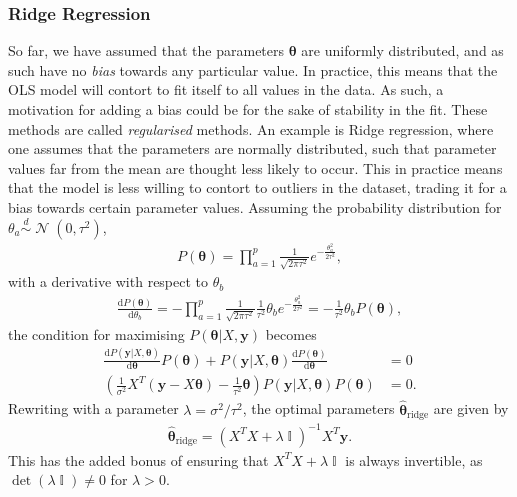 \documentclass[twocolumn,english,notitlepage]{article}
\renewcommand{\d}[2][x]{\ensuremath{\frac{\mathrm{d}#2}{\mathrm{d}#1}}}
\renewcommand{\vec}[1]{\boldsymbol{#1}}
\newcommand{\pclosed}[1]{\left(#1\right)}
\renewcommand{\exp}[1]{e^{#1}}
\newcommand{\normal}[2]{\operatorname{\mathcal{N}}\pclosed{#1,#2}}
\newcommand{\distas}{\overset{d}{\sim}}
\DeclareMathOperator{\eye}{\mathbb{I}}
\newcommand{\msub}[2]{\ensuremath{{#1}_\text{#2}}}
\begin{document}
        \subsubsection{Ridge Regression}
            So far, we have assumed that the parameters $\vec{\theta}$ are uniformly distributed, and as such have no \textit{bias} towards any particular value. In practice, this means that the OLS model will contort to fit itself to all values in the data. As such, a motivation for adding a bias could be for the sake of stability in the fit. These methods are called \textit{regularised} methods. An example is Ridge regression, where one assumes that the parameters are normally distributed, such that parameter values far from the mean are thought less likely to occur. This in practice means that the model is less willing to contort to outliers in the dataset, trading it for a bias towards certain parameter values. Assuming the probability distribution for $\theta_a \distas \normal{0}{\tau^2}$,
            \begin{align}
                P(\vec{\theta}) = \prod_{a=1}^{p} \frac{1}{\sqrt{2\pi\tau^2}} \exp{-\frac{\theta_a^2}{2\tau^2}},
            \end{align}
            with a derivative with respect to $\theta_b$
            \begin{align}
                \d[\theta_b]{P(\vec{\theta})} = -\prod_{a=1}^{p} \frac{1}{\sqrt{2\pi\tau^2}} \frac{1}{\tau^2} \theta_b \exp{-\frac{\theta_a^2}{2\tau^2}} = -\frac{1}{\tau^2} \theta_b P(\vec{\theta}),
            \end{align}
            the condition for maximising $P(\vec{\theta}|X, \vec{y})$ becomes
            \begin{align} \nonumber
                \d[\vec{\theta}]{P(\vec{y}|X, \vec{\theta})} P(\vec{\theta}) + P(\vec{y}|X, \vec{\theta}) \d[\vec{\theta}]{P(\vec{\theta})} &= 0 \\
                \pclosed{ \frac{1}{\sigma^2} X^T(\vec{y}-X\vec{\theta}) - \frac{1}{\tau^2} \vec{\theta} } P(\vec{y}|X,\vec{\theta}) P(\vec{\theta}) &= 0.
            \end{align}
            Rewriting with a parameter $\lambda = \sigma^2/\tau^2$, the optimal parameters $\msub{\vec{\hat{\theta}}}{ridge}$ are given by
            \begin{align}
                \boxed{
                \msub{\vec{\hat{\theta}}}{ridge} = \pclosed{X^TX + \lambda \eye}^{-1} X^T \vec{y}.
                \label{theo:eq:Ridge_coefs}
                }
            \end{align}
            This has the added bonus of ensuring that $X^TX + \lambda \eye$ is always invertible, as $\det(\lambda \eye) \neq 0$ for $\lambda>0$.
\end{document}

